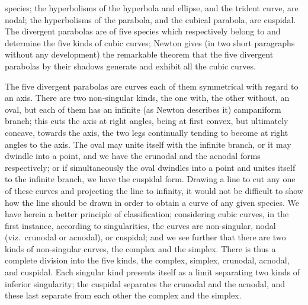 \documentclass[12pt,a4paper,oneside]{book}
\begin{document}
\newpage
species; the hyperbolisms of the hyperbola and ellipse, and the trident curve, are nodal; the hyperbolisms of the parabola, and the cubical parabola, are cuspidal. The divergent parabolas are of five species which respectively belong to and determine the five kinds of cubic curves; Newton gives (in two short paragraphs without any development) the remarkable theorem that the five divergent parabolas by their shadows generate and exhibit all the cubic curves.

The five divergent parabolas are curves each of them symmetrical with regard to an axis. There are two non-singular kinds, the one with, the other without, an oval, but each of them has an infinite (as Newton describes it) campaniform branch; this cuts the axis at right angles, being at first convex, but ultimately concave, towards the axis, the two legs continually tending to become at right angles to the axis. The oval may unite itself with the infinite branch, or it may dwindle into a point, and we have the crunodal and the acnodal forms respectively; or if simultaneously the oval dwindles into a point and unites itself to the infinite branch, we have the cuspidal form. Drawing a line to cut any one of these curves and projecting the line to infinity, it would not be difficult to show how the line should be drawn in order to obtain a curve of any given species. We have herein a better principle of classification; considering cubic curves, in the first instance, according to singularities, the curves are non-singular, nodal (viz.\ crunodal or acnodal), or cuspidal; and we see further that there are two kinds of non-singular curves, the complex and the simplex. There is thus a complete division into the five kinds, the complex, simplex, crunodal, acnodal, and cuspidal. Each singular kind presents itself as a limit separating two kinds of inferior singularity; the cuspidal separates the crunodal and the acnodal, and these last separate from each other the complex and the simplex.
\end{document}
